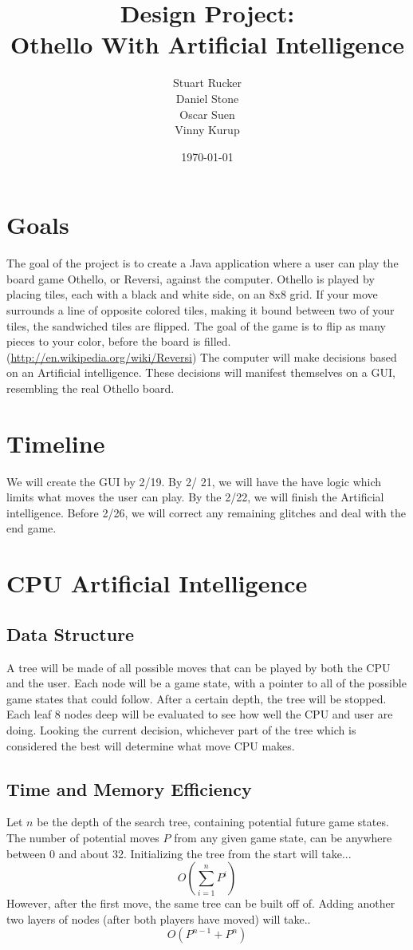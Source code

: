 \documentclass[12pt]{article}
\title{Design Project: \\ Othello With Artificial Intelligence}
\author{Stuart Rucker \\ Daniel Stone \\ Oscar Suen\\ Vinny Kurup}
\date{\today}
\begin{document}
\maketitle

\section{Goals}
The goal of the project is to create a Java application where a user can play the board game Othello, or Reversi, against the computer. Othello is played by placing tiles, each with a black and white side,  on an 8x8 grid. If your move surrounds a line of opposite colored tiles, making it bound between two of your tiles, the sandwiched tiles are flipped. The goal of the game is to flip as many pieces to your color, before the board is filled. (\url{http://en.wikipedia.org/wiki/Reversi}) The computer will make decisions based on an Artificial intelligence. These decisions will manifest themselves on a GUI, resembling the real Othello board.

\section{Timeline}
We will create the GUI by   2/19. By 2/ 21, we will have the have logic which limits what moves the user can play. By the 2/22, we will finish the Artificial intelligence. Before  2/26, we will correct any remaining glitches and deal with the end game.

\section{CPU Artificial Intelligence}
\subsection{Data Structure}
A tree will be made of all possible moves that can be played by both the CPU and the user. Each node will be a game state, with a pointer to all of the possible game states that could follow. After a certain depth, the tree will be stopped. Each leaf 8 nodes deep will be evaluated to see how well the CPU and user are doing. Looking the current decision, whichever part of the tree which is considered the best will determine what move CPU makes.
\subsection{Time and Memory Efficiency}
Let $n$ be the depth of the search tree, containing potential future game states. The number of potential moves $P$ from any given game state, can be anywhere between 0 and about 32. Initializing the tree from the start will take...
\begin{equation*}
O(\sum_{i=1}^{n}P^i)
\end{equation*}
However, after the first move, the same tree can be built off of. Adding another two layers of nodes (after both players have moved) will take..
\begin{equation*}
O(P^{n-1} + P^n)
\end{equation*}
\end{document}
